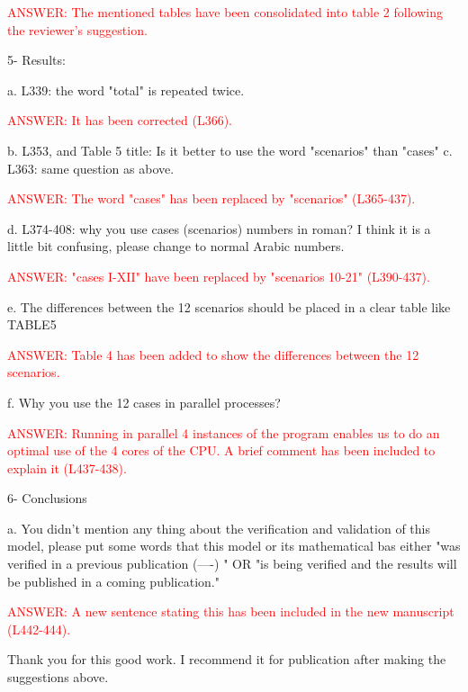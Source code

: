 \documentclass[a4paper]{article}
\begin{document}
\textcolor{red}{ANSWER: The mentioned tables have been consolidated into table 2
following the reviewer's suggestion.}

5- Results:

a. L339: the word "total" is repeated twice.

\textcolor{red}{ANSWER: It has been corrected (L366).}

b. L353, and Table 5 title: Is it better to use the word "scenarios" than "cases"
c. L363: same question as above.

\textcolor{red}{ANSWER: The word "cases" has been replaced by "scenarios"
(L365-437).}

d. L374-408: why you use cases (scenarios) numbers in roman? I think it is a little bit confusing, please change to normal Arabic numbers.

\textcolor{red}{ANSWER: "cases I-XII" have been replaced by "scenarios
10-21" (L390-437).}

e. The differences between the 12 scenarios should be placed in a clear table like TABLE5

\textcolor{red}{ANSWER: Table 4 has been added to show the differences
between the 12 scenarios.}

f. Why you use the 12 cases in parallel processes?

\textcolor{red}{ANSWER: Running in parallel 4 instances of the program enables us
to do an optimal use of the 4 cores of the CPU. A brief comment has been
included to explain it (L437-438).}

6- Conclusions

a. You didn't mention any thing about the verification and validation of this model, please put some words that this model or its mathematical bas either "was verified in a previous publication (----) " OR "is being verified and the results will be published in a coming publication."

\textcolor{red}{ANSWER: A new sentence stating this has been included in the new
manuscript (L442-444).}

Thank you for this good work. I recommend it for publication after making the suggestions above. 
\end{document}
